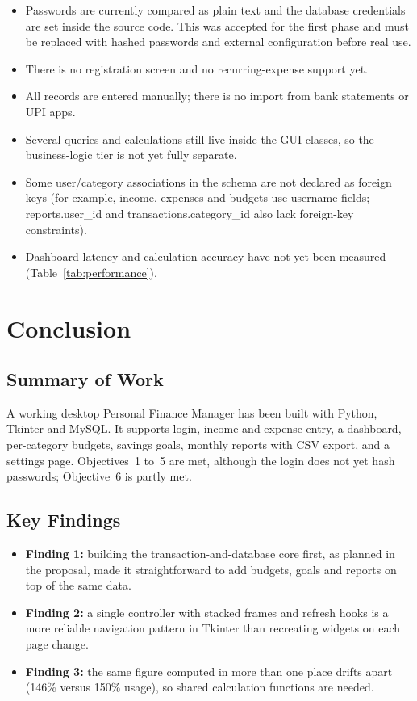 \documentclass{tietreport}
\begin{document}
\begin{itemize}
  \item Passwords are currently compared as plain text and the
    database credentials are set inside the source code. This was
    accepted for the first phase and must be replaced with hashed
    passwords and external configuration before real use.
  \item There is no registration screen and no recurring-expense
    support yet.
  \item All records are entered manually; there is no import from
    bank statements or UPI apps.
  \item Several queries and calculations still live inside the GUI
    classes, so the business-logic tier is not yet fully separate.
  \item Some user/category associations in the schema are not declared as foreign keys (for example, income, expenses and budgets use username fields; reports.user\_id and transactions.category\_id also lack foreign-key constraints).
  \item Dashboard latency and calculation accuracy have not yet been
    measured (Table~\ref{tab:performance}).
\end{itemize}


\chapter{Conclusion}

\section{Summary of Work}

A working desktop Personal Finance Manager has been built with
Python, Tkinter and MySQL. It supports login, income and expense
entry, a dashboard, per-category budgets, savings goals, monthly
reports with CSV export, and a settings page. Objectives~1 to~5
are met, although the login does not yet hash passwords;
Objective~6 is partly met.

\section{Key Findings}

\begin{itemize}
  \item \textbf{Finding 1:} building the transaction-and-database
    core first, as planned in the proposal, made it straightforward
    to add budgets, goals and reports on top of the same data.
  \item \textbf{Finding 2:} a single controller with stacked frames
    and refresh hooks is a more reliable navigation pattern in
    Tkinter than recreating widgets on each page change.
  \item \textbf{Finding 3:} the same figure computed in more than
    one place drifts apart (146\% versus 150\% usage), so shared
    calculation functions are needed.
\end{itemize}
\end{document}

